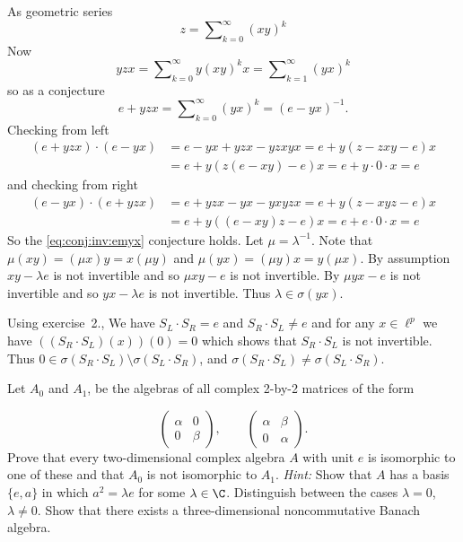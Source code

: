 \begin{enumerate}
\begin{itemize}
As geometric series
\begin{equation*}
z = \sum\nolimits_{k=0}^\infty (xy)^k
\end{equation*}
Now
\begin{equation*}
yzx
= \sum\nolimits_{k=0}^\infty y(xy)^kx
= \sum\nolimits_{k=1}^\infty (yx)^k
\end{equation*}
so as a conjecture
\begin{equation} \label{eq:conj:inv:emyx}
e + yzx = \sum\nolimits_{k=0}^\infty (yx)^k = (e - yx)^{-1}.
\end{equation}
Checking from left
\begin{align*}
(e + yzx)\cdot(e - yx)
 &= e - yx + yzx - yzxyx
  = e + y(z - zxy - e)x \\
 &= e + y(z(e - xy) - e)x 
  = e + y\cdot 0\cdot x = e
\end{align*}
and checking from right
\begin{align*}
(e - yx)\cdot(e + yzx)
 &= e + yzx - yx - yxyzx = e + y(z - xyz - e)x \\
 &= e + y((e - xy)z - e)x
    = e + e\cdot 0\cdot x = e
\end{align*}
So the \eqref{eq:conj:inv:emyx} conjecture holds.
Let \(\mu = \lambda^{-1}\).
Note that \(\mu (xy) = (\mu x)y = x(\mu y)\)
and \(\mu (yx) = (\mu y)x = y(\mu x)\).
By assumption \(xy -\lambda e\) is not invertible
and so \(\mu xy - e\) is not invertible.
By  \(\mu yx - e\) is not invertible
and so \(yx - \lambda e\) is not invertible. Thus \(\lambda \in \sigma(yx)\).

Using exercise~2.,
We have \(S_L\cdot S_R = e\) and \(S_R\cdot S_L \neq e\)
and for any \(x\in\ell^p\) we have \(((S_R\cdot S_L)(x))(0) = 0\)
which shows that \(S_R\cdot S_L\) is not invertible.
Thus \(0 \in \sigma(S_R\cdot S_L) \setminus  \sigma(S_L\cdot S_R) \),
and \(\sigma(S_R\cdot S_L) \neq  \sigma(S_L\cdot S_R)\).
\end{itemize}

\begin{excopy}
Let \(A_0\) and \(A_1\),
be the algebras of all complex 2-by-2 matrices of the form

\begin{equation*}
\left(
  \begin{array}{ll}
   \alpha & 0 \\
   0 & \beta
  \end{array}
\right),
\qquad
\left(
  \begin{array}{ll}
   \alpha & \beta \\
   0 & \alpha
  \end{array}
\right).
\end{equation*}
Prove that every two-dimensional complex algebra $A$ with unit $e$ is isomorphic
to one of these
  and that \(A_0\) is not isomorphic to \(A_1\).
    \emph{Hint:} Show that $A$ has a
basis \(\{e, a\}\) in which \(a^2 = \lambda e\) for some \(\lambda \in \C\).
  Distinguish between the cases
  \(\lambda=0\), \(\lambda \neq 0\).
  Show that there exists a three-dimensional noncommutative
Banach algebra.
\end{excopy}


\end{enumerate}
